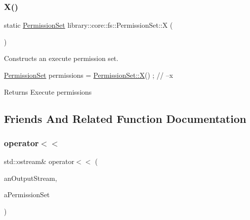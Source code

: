\subsubsection{\texorpdfstring{X()}{X()}}
{\footnotesize\ttfamily static \hyperlink{classlibrary_1_1core_1_1fs_1_1_permission_set}{Permission\+Set} library\+::core\+::fs\+::\+Permission\+Set\+::X (\begin{DoxyParamCaption}{ }\end{DoxyParamCaption})\hspace{0.3cm}{\ttfamily [static]}}



Constructs an execute permission set. 


\begin{DoxyCode}
\hyperlink{classlibrary_1_1core_1_1fs_1_1_permission_set_a8a6eb39cc2a8bca92a657d065d3e36ba}{PermissionSet} permissions = \hyperlink{classlibrary_1_1core_1_1fs_1_1_permission_set_a7f4717643d0b80b0b98104c357b3322f}{PermissionSet::X}() ; \textcolor{comment}{// --x}
\end{DoxyCode}


\begin{DoxyReturn}{Returns}
Execute permissions 
\end{DoxyReturn}


\subsection{Friends And Related Function Documentation}
\mbox{\label{classlibrary_1_1core_1_1fs_1_1_permission_set_a8f2d68bb94d86dea76869abe148ea9f3}} 
\subsubsection{\texorpdfstring{operator$<$$<$}{operator<<}}
{\footnotesize\ttfamily std\+::ostream\& operator$<$$<$ (\begin{DoxyParamCaption}\item[{std\+::ostream \&}]{an\+Output\+Stream,  }\item[{const \hyperlink{classlibrary_1_1core_1_1fs_1_1_permission_set}{Permission\+Set} \&}]{a\+Permission\+Set }\end{DoxyParamCaption})\hspace{0.3cm}{\ttfamily [friend]}}



